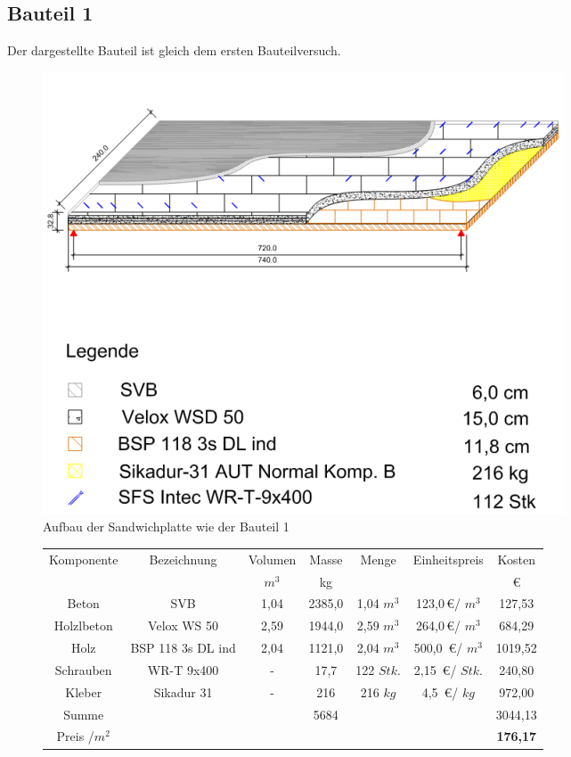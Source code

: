 \subsection{Bauteil 1}
Der dargestellte Bauteil ist gleich dem ersten Bauteilversuch.
\begin{figure}[h!]
\begin{center}
\includegraphics[scale =0.8]{Wirtschaftlichkeitsvergleich/Varianten/var1.jpg}
\caption{Aufbau der Sandwichplatte wie der Bauteil 1}
\end{center}
\end{figure}


\begin{figure}[h!]
\begin{center}
\begin{tabular}{|c|c|c|c|c|c|c|}
\hline 
Komponente & Bezeichnung & Volumen & Masse & Menge & Einheitspreis & Kosten \\ 

 &  & $m^{3}$ & kg &  &  & \euro \\ 
\hline \hline
Beton & SVB & 1,04 & 2385,0  & 1,04 $m^{3}$ & 123,0\,\euro / $m^{3}$ & 127,53 \\ 
\hline 
Holzlbeton & Velox WS 50 & 2,59 & 1944,0  & 2,59 $m^{3}$ & 264,0\,\euro / $m^{3}$ & 684,29 \\ 
\hline 
Holz & BSP 118 3s DL ind & 2,04 & 1121,0 & 2,04 $m^{3}$ & 500,0 \,\euro / $m^{3}$ & 1019,52 \\ 
\hline 
Schrauben & WR-T 9x400 & - & 17,7 & 122 $Stk.$ & 2,15 \,\euro / $Stk.$ & 240,80 \\ 
\hline 
Kleber & Sikadur 31  & - & 216  & 216 $kg$ & 4,5 \,\euro / $kg$& 972,00 \\ 
\hline \hline
Summe & &  & 5684 &  &  & 3044,13 \\ 
\hline 
Preis /$m^{2}$&  & &  &  &  & \textbf{176,17} \\ 
\hline 
\end{tabular} 
\end{center}
\end{figure}



